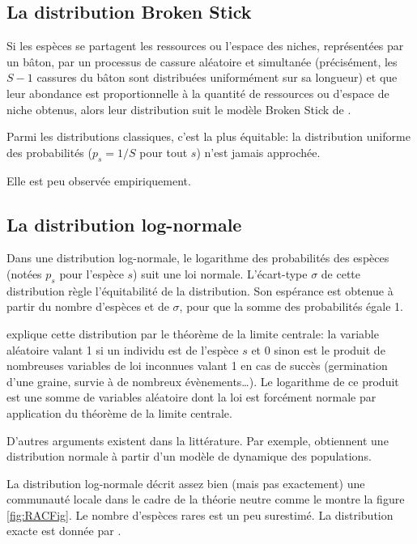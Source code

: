 \documentclass[
  11pt,
  french,
  a4paper,
  extrafontsizes,onecolumn,openright
  ]{memoir}
\begin{document}
\hypertarget{la-distribution-broken-stick}{%
\subsection{La distribution Broken Stick}\label{la-distribution-broken-stick}}

Si les espèces se partagent les ressources ou l'espace des niches, représentées par un bâton, par un processus de cassure aléatoire et simultanée (précisément, les \(S-1\) cassures du bâton sont distribuées uniformément sur sa longueur) et que leur abondance est proportionnelle à la quantité de ressources ou d'espace de niche obtenus, alors leur distribution suit le modèle Broken Stick de \textcite{MacArthur1957}.

Parmi les distributions classiques, c'est la plus équitable: la distribution uniforme des probabilités (\(p_s=1/S\) pour tout \(s\)) n'est jamais approchée.

Elle est peu observée empiriquement.

\hypertarget{la-distribution-log-normale}{%
\subsection{La distribution log-normale}\label{la-distribution-log-normale}}

Dans une distribution log-normale, le logarithme des probabilités des espèces (notées \(p_s\) pour l'espèce \(s\)) suit une loi normale.
L'écart-type \(\sigma\) de cette distribution règle l'équitabilité de la distribution.
Son espérance est obtenue à partir du nombre d'espèces et de \(\sigma\), pour que la somme des probabilités égale 1.

\textcite{May1975} explique cette distribution par le théorème de la limite centrale: la variable aléatoire valant 1 si un individu est de l'espèce \(s\) et 0 sinon est le produit de nombreuses variables de loi inconnues valant 1 en cas de succès (germination d'une graine, survie à de nombreux évènements\ldots).
Le logarithme de ce produit est une somme de variables aléatoire dont la loi est forcément normale par application du théorème de la limite centrale.

D'autres arguments existent dans la littérature.
Par exemple, \textcite{Engen1996} obtiennent une distribution normale à partir d'un modèle de dynamique des populations.

La distribution log-normale décrit assez bien (mais pas exactement) une communauté locale dans le cadre de la théorie neutre \autocite{Hubbell2001} comme le montre la figure \ref{fig:RACFig}.
Le nombre d'espèces rares est un peu surestimé.
La distribution exacte est donnée par \textcite{Volkov2003}.
\end{document}
